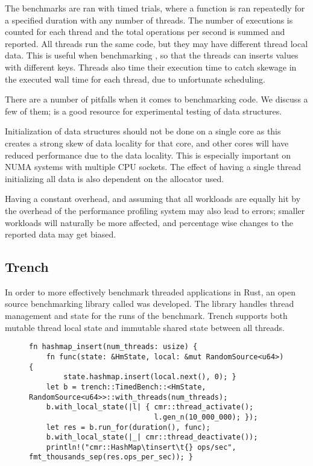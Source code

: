 The benchmarks are ran with timed trials, where a function is ran repeatedly for a specified
duration with any number of threads. The number of executions is counted for each thread and the
total operations per second is summed and reported. All threads run the same code, but they may
have different thread local data. This is useful when benchmarking , so that
the threads can inserts values with different keys. Threads also time their execution time to catch
skewage in the executed wall time for each thread, due to unfortunate scheduling.

There are a number of pitfalls when it comes to benchmarking code. We discuss a few of them;
\cite{rare} is a good resource for experimental testing of data structures.

Initialization of data structures should not be done on a single core as this creates
a strong skew of data locality for that core, and other cores will have reduced performance due to
the data locality. This is especially important on NUMA systems with multiple CPU sockets.
The effect of having a single thread initializing all data is also dependent on the allocator used.

Having a constant overhead, and assuming that all workloads are equally hit by the overhead of the
performance profiling system may also lead to errors; smaller workloads will naturally be more
affected, and percentage wise changes to the reported data may get biased.


\subsection{Trench}


In order to more effectively benchmark threaded applications in Rust, an open source benchmarking library
called \cite{trench} was developed. The library handles thread management and state
for the runs of the benchmark. Trench supports both mutable thread local state and immutable shared
state between all threads.

\begin{figure}[ht]
\begin{lstlisting}[style=Rust,
label=lst:trench-ex,caption=\code{Hashmap::insert} benchmark using \code{trench}]
fn hashmap_insert(num_threads: usize) {
    fn func(state: &HmState, local: &mut RandomSource<u64>) {
        state.hashmap.insert(local.next(), 0); }
    let b = trench::TimedBench::<HmState, RandomSource<u64>>::with_threads(num_threads);
    b.with_local_state(|l| { cmr::thread_activate();
                             l.gen_n(10_000_000); });
    let res = b.run_for(duration(), func);
    b.with_local_state(|_| cmr::thread_deactivate());
    println!("cmr::HashMap\tinsert\t{} ops/sec", fmt_thousands_sep(res.ops_per_sec)); }
\end{lstlisting}
\end{figure}


